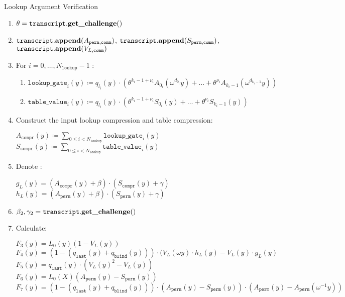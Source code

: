 \begin{algorithm}[H]
\caption{Lookup Argument Verification}
\begin{enumerate}
	\item $\theta = \texttt{transcript}.\textbf{get\_challenge}()$
	\item $\texttt{transcript}.\textbf{append}(A_{\texttt{perm}, \texttt{comm}})$, $\texttt{transcript}.\textbf{append}(S_{\texttt{perm}, \texttt{comm}})$, $\texttt{transcript}.\textbf{append}(V_{L, \texttt{comm}})$
	\item For $i = 0, \dots, N_{\texttt{lookup}} - 1$ :
		\begin{enumerate}
			\item $\texttt{lookup\_gate}_i(y) \coloneqq q_{l_i}(y) \cdot (\theta^{k_i - 1 + \nu_i}A_{0_i}(\omega^{d_{0_i}}y) + \dots
					 + \theta^{\nu_i}A_{k_i - 1}(\omega^{d_{k_i - 1}}y))$
			\item $\texttt{table\_value}_i(y) \coloneqq q_{l_i}(y) \cdot (\theta^{k_i - 1 + \nu_i}S_{0_i}(y) + \dots 
					 + \theta^{\nu_i}S_{k_i - 1}(y))$
		\end{enumerate}
	\item Construct the input lookup compression and table compression:
        \begin{center}
            $A_{\texttt{compr}}(y) \coloneqq \sum_{0 \leq i < N_{\texttt{lookup}}} \texttt{lookup\_gate}_i (y)$ \\
            $S_{\texttt{compr}}(y) \coloneqq \sum_{0 \leq i < N_{\texttt{lookup}}} \texttt{table\_value}_i (y)$
        \end{center}
	\item Denote :
	    \begin{center}
	    	$g_L(y) = (A_{\texttt{compr}}(y) + \beta) \cdot (S_{\texttt{compr}}(y) + \gamma)$ \\
	    	$h_L(y) = (A_{\texttt{perm}}(y) + \beta) \cdot (S_{\texttt{perm}}(y) + \gamma)$
	    \end{center}
	\item $\beta_2, \gamma_2 = \texttt{transcript}.\textbf{get\_challenge}()$
	\item Calculate:
	        \begin{center}
	            $F_3(y) = L_0(y)(1 - V_L(y))$ \\
	            $F_4(y) = (1 - (q_{\texttt{last}}(y) + q_{\texttt{blind}}(y))) \cdot (
	            					V_L(\omega y) \cdot h_L(y)
	            					- V_L(y) \cdot g_L(y)$ \\
	            $F_5(y) = q_{\texttt{last}}(y) \cdot (V_L(y)^2 - V_L(y))$ \\
	            $F_6(y) = L_0(X)(A_{\texttt{perm}}(y) - S_{\texttt{perm}}(y))$ \\
	            $F_7(y) = (1 - (q_{\texttt{last}}(y) + q_{\texttt{blind}}(y))) \cdot
	            					(A_{\texttt{perm}}(y) - S_{\texttt{perm}}(y)) \cdot
	            					(A_{\texttt{perm}}(y) - A_{\texttt{perm}}(\omega^{-1}y))$
	        \end{center}
\end{enumerate}
\end{algorithm}


